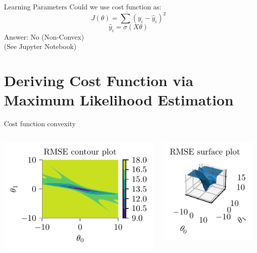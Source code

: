 \documentclass{beamer}
\begin{document}
\begin{frame}{Learning Parameters}
Could we use cost function as:
\begin{equation*}
J(\theta) = \sum (y_{i} - \hat{y}_{i})^{2}
\end{equation*}
\begin{equation*}
\hat{y}_{i} = \sigma(X\theta)
\end{equation*}
Answer: No (Non-Convex) \\ \hspace{1.2cm} (See Jupyter Notebook)
\end{frame}


\section{Deriving Cost Function via Maximum Likelihood Estimation}

\begin{frame}{Cost function convexity}
\begin{columns}
	\begin{column}{0.5\textwidth}
		\includegraphics[scale=0.7]{../figures/logistic-regression/logistic-sse-loss-contour.pdf}
	\end{column}
\begin{column}{0.5\textwidth}
	\includegraphics[scale=0.7]{../figures/logistic-regression/logistic-sse-loss-3d.pdf}
\end{column}
\end{columns}
\end{frame}
\end{document}

